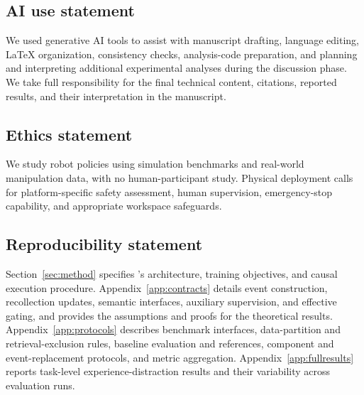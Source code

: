 \subsection*{AI use statement}
We used generative AI tools to assist with manuscript drafting, language editing, LaTeX organization, consistency checks, analysis-code preparation, and planning and interpreting additional experimental analyses during the discussion phase.
We take full responsibility for the final technical content, citations, reported results, and their interpretation in the manuscript.

\subsection*{Ethics statement}
We study robot policies using simulation benchmarks and real-world manipulation data, with no human-participant study.
Physical deployment calls for platform-specific safety assessment, human supervision, emergency-stop capability, and appropriate workspace safeguards.

\subsection*{Reproducibility statement}
Section~\ref{sec:method} specifies \method{}'s architecture, training objectives, and causal execution procedure.
Appendix~\ref{app:contracts} details event construction, recollection updates, semantic interfaces, auxiliary supervision, and effective gating, and provides the assumptions and proofs for the theoretical results.
Appendix~\ref{app:protocols} describes benchmark interfaces, data-partition and retrieval-exclusion rules, baseline evaluation and references, component and event-replacement protocols, and metric aggregation.
Appendix~\ref{app:fullresults} reports task-level experience-distraction results and their variability across evaluation runs.
